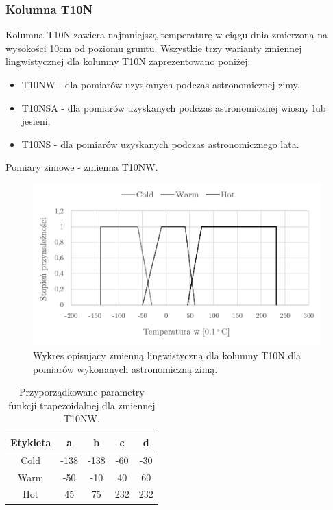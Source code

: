 \documentclass{classrep}
\begin{document}
\subsubsection{Kolumna T10N}
Kolumna T10N zawiera najmniejszą temperaturę w ciągu dnia zmierzoną na wysokości 10cm od poziomu gruntu. Wszystkie trzy warianty zmiennej lingwistycznej dla kolumny T10N zaprezentowano poniżej:

\begin{itemize}[label=$\bullet$\scshape\bfseries]
\item T10NW - dla pomiarów uzyskanych podczas astronomicznej zimy,
\item T10NSA - dla pomiarów uzyskanych podczas astronomicznej wiosny lub jesieni,
\item T10NS - dla pomiarów uzyskanych podczas astronomicznego lata.\newline\newline\newline
\end{itemize}


Pomiary zimowe - zmienna T10NW.
\begin{figure}[H]
	\centering
	\includegraphics[width=0.99\textwidth]{Pictures/TermsCharts/T10_Z.png}
	\caption{Wykres opisujący zmienną lingwistyczną dla kolumny T10N dla pomiarów wykonanych astronomiczną zimą.}
\end{figure}

\begin{table}[H]
	\centering
	\begin{tabular}{c c c c c} 
		\hline
		\textbf{Etykieta} & \textbf{a} & \textbf{b} & \textbf{c} & \textbf{d}\\ [0.5ex] 
		\hline
		\hline 
Cold	 & -138 & -138 & -60 & -30 \\
Warm & -50 & -10 & 40 & 60 \\
Hot	 & 45 & 75 & 232 & 232 \\
		\hline
	\end{tabular}
	\caption{Przyporządkowane parametry funkcji trapezoidalnej dla zmiennej T10NW.}
\end{table}
\end{document}
